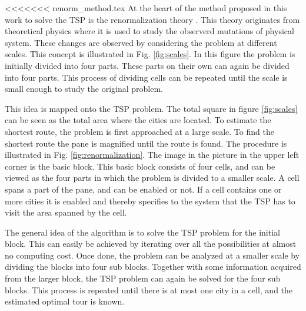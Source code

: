 <<<<<<< renorm_method.tex
At the heart of the method proposed in this work to solve the TSP is the
renormalization theory \cite{yoshiyuki1995nms}. This theory originates from theoretical physics where
it is used to study the observerd mutations of physical system. These changes
are observed by considering the problem at different scales. This concept is
illustrated in Fig. \ref{fig:scales}. In this figure the problem is initially
divided into four parts. These parts on their own can again be divided into
four parts. This process of dividing cells can be repeated until the scale is
small enough to study the original problem.

This idea is mapped onto the TSP problem. The total square in figure
\ref{fig:scales} can be seen as the total area where the cities are located.
To estimate the shortest route, the problem is first approached at a large
scale. To find the shortest route the pane is magnified until the route is
found. The procedure is illustrated in Fig. \ref{fig:renormalization}. The
image in the picture in the upper left corner is the basic block. This basic
block consists of four cells, and can be viewed as the four parts in which the
problem is divided to a smaller scale. A cell spans a part of the
pane, and can be enabled or not. If a cell contains one or more cities it is
enabled and thereby specifies to the system that the TSP has to visit the area
spanned by the cell.

The general idea of the algorithm is to solve the TSP problem
for the initial block. This can easily be achieved by iterating over all the
possibilities at almost no computing cost. Once done, the problem can be
analyzed at a smaller scale by dividing the blocks into four sub blocks.
Together with some information acquired from the larger block, the TSP 
problem can again be solved for the four sub blocks. This process is
repeated until there is at most one city in a cell, and the estimated optimal
tour is known. 

